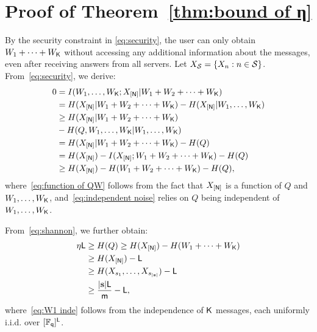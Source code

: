 \documentclass[conference,letterpaper]{IEEEtran}
\begin{document}
\clearpage

 
\clearpage


  \appendices


\section{Proof of Theorem~\ref{thm:bound of η}}
\label{sec:bound proof}
By the security constraint in \eqref{eq:security}, the user can only obtain $W_1+\cdots+W_{{\sf K}}$ without accessing any additional information about the messages, even after receiving answers from all servers. Let $X_{{\cal S}}=\{X_n: n \in {\cal S}\}$. From~\eqref{eq:security}, we derive:
\begin{subequations}
\begin{align}
0 &= I(W_1, \ldots, W_{{\sf K}}; X_{[{\sf N}]} | W_1+W_2+\cdots+W_{{\sf K}}) \\
  &= H(X_{[{\sf N}]} | W_1+W_2+\cdots+W_{{\sf K}}) - H(X_{[{\sf N}]} | W_1, \ldots, W_{{\sf K}}) \\
  &\geq H(X_{[{\sf N}]} | W_1+W_2+\cdots+W_{{\sf K}}) \nonumber\\
  &- H(Q, W_1, \ldots, W_{{\sf K}} | W_1, \ldots, W_{{\sf K}}) \label{eq:function of QW} \\
  &= H(X_{[{\sf N}]} | W_1+W_2+\cdots+W_{{\sf K}}) - H(Q) \label{eq:independent noise} \\
  &= H(X_{[{\sf N}]}) - I(X_{[{\sf N}]}; W_1+W_2+\cdots+W_{{\sf K}}) - H(Q) \\
  &\geq H(X_{[{\sf N}]}) - H(W_1+W_2+\cdots+W_{{\sf K}}) - H(Q), \label{eq:shannon}
\end{align}
\end{subequations}
where~\eqref{eq:function of QW} follows from the fact that $X_{[{\sf N}]}$ is a function of $Q$ and $W_1, \ldots, W_{{\sf K}}$, and~\eqref{eq:independent noise} relies on $Q$ being independent of $W_1, \ldots, W_{{\sf K}}$.

From~\eqref{eq:shannon}, we further obtain:
\begin{subequations}
\begin{align}
\eta {\sf L} &\geq H(Q) \geq H(X_{[{\sf N}]}) - H(W_1+\cdots+W_{{\sf K}}) \\
          &\geq H(X_{[{\sf N}]}) - {\sf L} \label{eq:W1 inde} \\
          &\geq H(X_{s_1}, \ldots, X_{s_{|{\bf s}|}}) - {\sf L} \\
          &\geq  \frac{|{\bf s}|{\sf L}}{{\sf m}} - {\sf L}, \label{eq:lemma converse all term}
\end{align}
\end{subequations}
where~\eqref{eq:W1 inde} follows from the independence of ${\sf K}$ messages, each uniformly i.i.d. over $[\mathbb{F}_{{\sf q}}]^{{\sf L}}$. %
\end{document}
